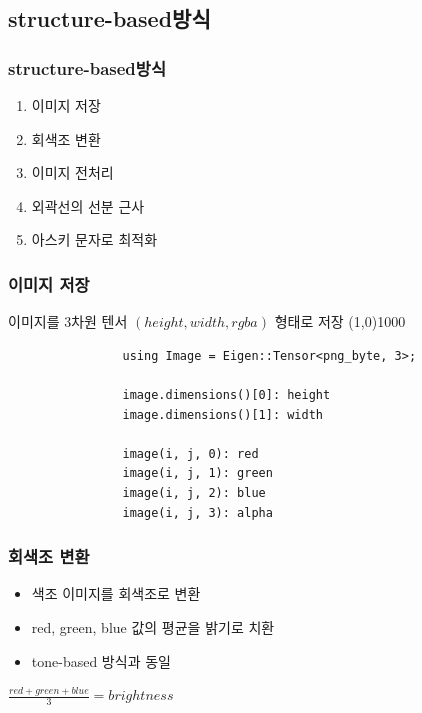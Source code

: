 \documentclass{beamer}
\newcommand{\spacing}{\hspace{0.3em}}
\newcommand{\structurebased}{\textbf{structure-based}}
\begin{document}
	\subsection{\structurebased \spacing 방식}
	\begin{frame}{}
		\frametitle{\structurebased \spacing 방식}
		\begin{enumerate}
			\item 이미지 저장
			\item 회색조 변환
			\item 이미지 전처리
			\item 외곽선의 선분 근사
			\item 아스키 문자로 최적화
		\end{enumerate}
	\end{frame}
	\begin{frame}[fragile]
		\frametitle{이미지 저장}
			이미지를 3차원 텐서 $ ( height, width, rgba ) $ 형태로 저장
			\line(1,0){1000}
			\begin{verbatim}
				using Image = Eigen::Tensor<png_byte, 3>;
				
				image.dimensions()[0]: height
				image.dimensions()[1]: width

				image(i, j, 0): red
				image(i, j, 1): green
				image(i, j, 2): blue
				image(i, j, 3): alpha
			\end{verbatim}
	\end{frame}
	\begin{frame}{}
		\frametitle{회색조 변환}
		\begin{itemize}
			\item 색조 이미지를 회색조로 변환
			\item red, green, blue 값의 평균을 밝기로 치환
			\item tone-based 방식과 동일
		\end{itemize}
		\vspace{2em}
		\centering
		$ \displaystyle \frac{red + green + blue}{3} = brightness $
	\end{frame}
\end{document}
